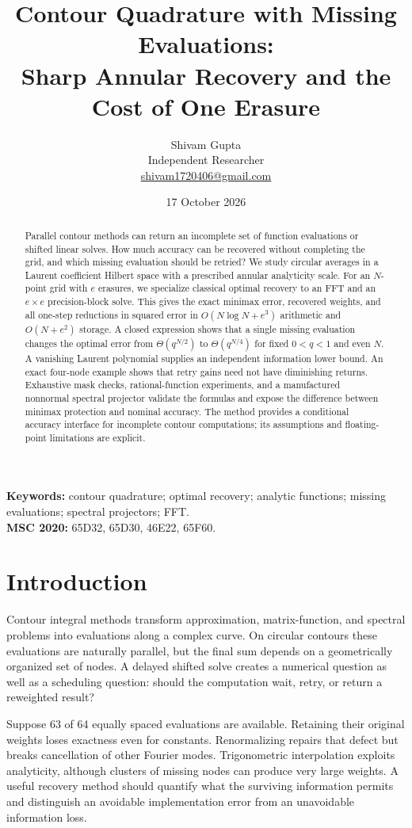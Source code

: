 \documentclass[11pt]{article}
\title{Contour Quadrature with Missing Evaluations:\\Sharp Annular Recovery and the Cost of One Erasure}
\author{Shivam Gupta\\\small Independent Researcher\\\small\href{mailto:shivam1720406@gmail.com}{shivam1720406@gmail.com}}
\date{17 October 2026}
\begin{document}
\maketitle
\begin{abstract}
Parallel contour methods can return an incomplete set of function evaluations or shifted linear solves. How much accuracy can be recovered without completing the grid, and which missing evaluation should be retried? We study circular averages in a Laurent coefficient Hilbert space with a prescribed annular analyticity scale. For an $N$-point grid with $e$ erasures, we specialize classical optimal recovery to an FFT and an $e\times e$ precision-block solve. This gives the exact minimax error, recovered weights, and all one-step reductions in squared error in $O(N\log N+e^3)$ arithmetic and $O(N+e^2)$ storage. A closed expression shows that a single missing evaluation changes the optimal error from $\Theta(q^{N/2})$ to $\Theta(q^{N/4})$ for fixed $0<q<1$ and even $N$. A vanishing Laurent polynomial supplies an independent information lower bound. An exact four-node example shows that retry gains need not have diminishing returns. Exhaustive mask checks, rational-function experiments, and a manufactured nonnormal spectral projector validate the formulas and expose the difference between minimax protection and nominal accuracy. The method provides a conditional accuracy interface for incomplete contour computations; its assumptions and floating-point limitations are explicit.
\end{abstract}
\noindent\textbf{Keywords:} contour quadrature; optimal recovery; analytic functions; missing evaluations; spectral projectors; FFT.\\
\textbf{MSC 2020:} 65D32, 65D30, 46E22, 65F60.

\section{Introduction}
Contour integral methods transform approximation, matrix-function, and spectral problems into evaluations along a complex curve. On circular contours these evaluations are naturally parallel, but the final sum depends on a geometrically organized set of nodes. A delayed shifted solve creates a numerical question as well as a scheduling question: should the computation wait, retry, or return a reweighted result?

Suppose 63 of 64 equally spaced evaluations are available. Retaining their original weights loses exactness even for constants. Renormalizing repairs that defect but breaks cancellation of other Fourier modes. Trigonometric interpolation exploits analyticity, although clusters of missing nodes can produce very large weights. A useful recovery method should quantify what the surviving information permits and distinguish an avoidable implementation error from an unavoidable information loss.
\end{document}

